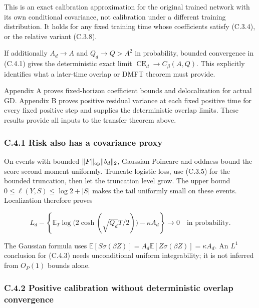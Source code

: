 \documentclass[
  11pt,
  a4paper,
]{article}
\begin{document}
This is an exact calibration approximation for the original trained
network with its own conditional covariance, not calibration under a
different training distribution. It holds for any fixed training time
whose coefficients satisfy (C.3.4), or the relative variant (C.3.8).

If additionally \(A_d\to A\) and \(Q_d\to Q>A^2\) in probability,
bounded convergence in (C.4.1) gives the deterministic exact limit
\(\operatorname{CE}_d\to C_\beta(A,Q)\). This explicitly identifies what
a later-time overlap or DMFT theorem must provide.

Appendix A proves fixed-horizon coefficient bounds and delocalization
for actual GD. Appendix B proves positive residual variance at each
fixed positive time for every fixed positive step and supplies the
deterministic overlap limits. These results provide all inputs to the
transfer theorem above.

\hypertarget{c.4.1-risk-also-has-a-covariance-proxy}{%
\subsubsection{C.4.1 Risk also has a covariance
proxy}\label{c.4.1-risk-also-has-a-covariance-proxy}}

On events with bounded \(\|F\|_{\rm op}\|b_d\|_2\), Gaussian Poincare
and oddness bound the score second moment uniformly. Truncate logistic
loss, use (C.3.5) for the bounded truncation, then let the truncation
level grow. The upper bound \(0\le\ell(Y,S)\le\log2+|S|\) makes the tail
uniformly small on these events. Localization therefore proves

\[
L_d-\left\{
 \mathbb E_T\log\bigl(2\cosh(\sqrt{Q_d}T/2)\bigr)
 -\kappa A_d\right\}\longrightarrow0
\quad\text{in probability}.
\tag{C.4.3}
\]

The Gaussian formula uses
\(\mathbb E[S\sigma(\beta Z)]=A_d\mathbb E[Z\sigma(\beta Z)] =\kappa A_d\).
An \(L^1\) conclusion for (C.4.3) needs unconditional uniform
integrability; it is not inferred from \(O_P(1)\) bounds alone.

\hypertarget{c.4.2-positive-calibration-without-deterministic-overlap-convergence}{%
\subsubsection{C.4.2 Positive calibration without deterministic overlap
convergence}\label{c.4.2-positive-calibration-without-deterministic-overlap-convergence}}
\end{document}
